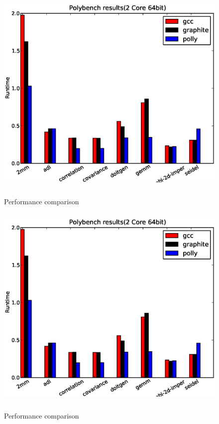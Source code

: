 \begin{figure}
\begin{center}
  \label{fig:2core2}
  \includegraphics[height=10cm]{images/2core64bit.eps}
  \caption{Performance comparison}
\end{center}
\end{figure}

\begin{figure}
\begin{center}
  \label{fig:10core}
  \includegraphics[height=10cm]{images/2core64bit.eps}
  \caption{Performance comparison}
\end{center}
\end{figure}
